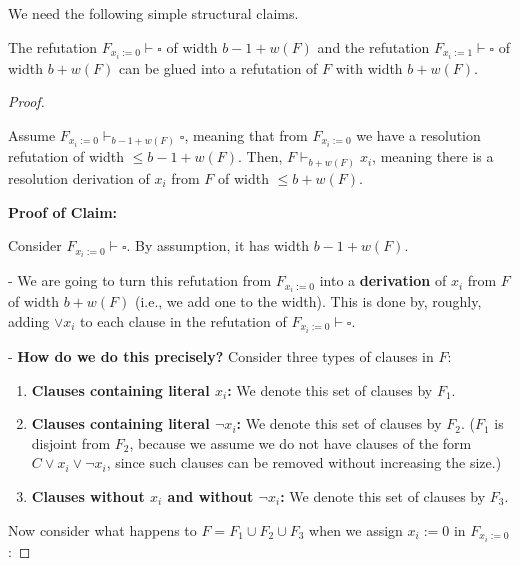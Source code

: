 We need the following simple structural claims.


\begin{lemma}
The refutation $F_{x_i := 0} \vdash \square$ of width $b - 1 + w(F)$  
and the refutation $F_{x_i := 1} \vdash \square$ of width $b + w(F)$  
can be glued into a refutation of $F$ with width $b + w(F)$.
\end{lemma}

\begin{proof}

\begin{claim}
Assume $F_{x_i := 0} \vdash_{b - 1 + w(F)} \square$, meaning that from $F_{x_i := 0}$ we have a resolution refutation of width $\leq b - 1 + w(F)$. Then, $F \vdash_{b + w(F)} x_i$, meaning there is a resolution derivation of $x_i$ from $F$ of width $\leq b + w(F)$.
\end{claim}

\textbf{Proof of Claim:} 

Consider $F_{x_i := 0} \vdash \square$. By assumption, it has width $b - 1 + w(F)$.

- We are going to turn this refutation from $F_{x_i := 0}$ into a \textbf{derivation} of $x_i$ from $F$ of width $b + w(F)$ (i.e., we add one to the width).  
  This is done by, roughly, adding $\lor x_i$ to each clause in the refutation of $F_{x_i := 0} \vdash \square$.

- \textbf{How do we do this precisely?}  
  Consider three types of clauses in $F$:

  \begin{enumerate}
      \item \textbf{Clauses containing literal $x_i$:}  
      We denote this set of clauses by $F_1$.
      
      \item \textbf{Clauses containing literal $\neg x_i$:}  
      We denote this set of clauses by $F_2$.  
      ($F_1$ is disjoint from $F_2$, because we assume we do not have clauses of the form $C \lor x_i \lor \neg x_i$, since such clauses can be removed without increasing the size.)

      \item \textbf{Clauses without $x_i$ and without $\neg x_i$:}  
      We denote this set of clauses by $F_3$.
  \end{enumerate}
 

Now consider what happens to $F = F_1 \cup F_2 \cup F_3$  
when we assign $x_i := 0$ in $F_{x_i := 0}$:


\end{proof}
